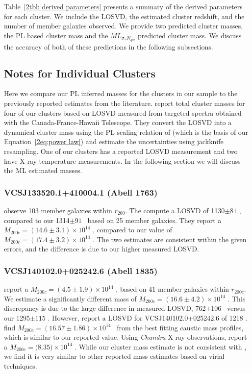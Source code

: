 Table~\ref{2tbl: derived parameters} presents a summary of the derived parameters for each cluster. We include the LOSVD, the estimated cluster redshift, and the number of member galaxies observed. We provide two predicted cluster masses, the PL based cluster mass and the $ML_{\sigma, N_{gal}}$ predicted cluster mass. We discuss the accuracy of both of these predictions in the following subsections.

\subsection{Notes for Individual Clusters}
Here we compare our PL inferred masses for the clusters in our sample to the previously reported estimates from the literature. \cite{Sifon2015} report total cluster masses for four of our clusters based on LOSVD measured from targeted spectra obtained with the Canada-France-Hawaii Telescope. They convert the LOSVD into a dynamical cluster mass using the PL scaling relation of \cite{Evrard2008} (which is the basis of our Equation~\ref{2eq:power law}) and estimate the uncertainties using jackknife resampling. One of our clusters has a reported LOSVD measurement and two have X-ray temperature measurements. In the following section we will discuss the ML estimated masses.

\subsubsection{VCSJ133520.1+410004.1 (Abell 1763)}
\cite{Sifon2015} observe 103 member galaxies within $r_{200}$. The compute a LOSVD of 1130$\pm81$ \kms, compared to our 1314$\pm91$ \kms\ based on 25 member galaxies. They report a $M_{200c} = (14.6\pm3.1) \times 10^14$ \Msol, compared to our value of $M_{200c} = (17.4\pm3.2) \times 10^14$ \Msol. The two estimates are consistent within the given errors, and the difference is due to our higher measured LOSVD.

\subsubsection{VCSJ140102.0+025242.6 (Abell 1835)}
\cite{Sifon2015} report a $M_{200c} = (4.5\pm1.9) \times 10^14$ \Msol, based on 41 member galaxies within
$r_{200c}$. We estimate a significantly different mass of $M_{200c} = (16.6\pm4.2)\times 10^{14}$ \Msol.
This discrepancy is due to the large difference in measured LOSVD, 762$\pm106$ \kms\ versus our
1295$\pm115$ \kms. However, \cite{Hoekstra2012} report a LOSVD for VCSJ140102.0+025242.6 of 1218 \kms.
\cite{Geller2013} find $M_{200c} = (16.57\pm1.86)\times 10^{14}$ \Msol\ from the best fitting caustic mass
profiles, which is similar to our reported value. Using \emph{Chandra} X-ray observations,
\cite{Bonamente2012} report a $M_{200c} = (8.35$$)\times 10^{14}$ \Msol. While our cluster
mass estimate is not consistent with \cite{Sifon2015}, we find it is very similar to other reported mass
estimates based on virial techniques.

